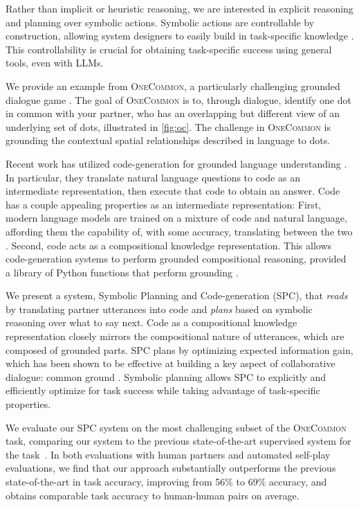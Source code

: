 \documentclass[11pt]{article}
\newcommand{\system}{SPC}
\newcommand{\justin}[1]{{{\textcolor{purple}{(Justin: #1)}}}}
\begin{document}
Rather than implicit or heuristic reasoning, we are interested in explicit reasoning and planning over
symbolic actions.
Symbolic actions are controllable by construction,
allowing system designers to easily build in task-specific knowledge \citep{he2018dnd,cicero}.
This controllability is crucial for obtaining task-specific success using general tools,
even with LLMs.

We provide an example from \textsc{OneCommon}, 
a particularly challenging grounded dialogue game \citep{onecommon}.
The goal of \textsc{OneCommon} is to, through dialogue, identify one dot in common with your partner,
who has an overlapping but different view of an underlying set of dots, illustrated in \autoref{fig:oc}.
The challenge in \textsc{OneCommon} is grounding the contextual spatial relationships described in language to dots.

Recent work has utilized code-generation for grounded language understanding \citep{vipergpt}.
In particular, they translate natural language questions to code as an intermediate representation, then execute that code to obtain an answer.
Code has a couple appealing properties as an intermediate representation: First, 
modern language models are trained on a mixture of code and natural language, affording them the capability of, with some accuracy, translating between the two \citep{chen2021evaluating}.
Second, code acts as a compositional knowledge representation.
This allows code-generation systems to perform grounded compositional reasoning,
provided a library of Python functions that perform grounding \citep{codeaspolicies2022}.

We present a system, Symbolic Planning and Code-generation (\system{}), 
that \textit{reads} by translating partner utterances into code and \textit{plans}
based on symbolic reasoning over what to say next.
Code as a compositional knowledge representation closely mirrors the compositional nature of utterances, which are composed of grounded parts.
\system{} plans by optimizing expected information gain, which has been shown to be effective at building 
a key aspect of collaborative dialogue: common ground \citep{yu2019info,white-etal-2021-open,ocp}.
Symbolic planning allows \system{} to explicitly and efficiently optimize for task success while taking advantage of task-specific properties.

We evaluate our \system{} system on the most challenging subset of the \textsc{OneCommon} task, comparing our system to the previous state-of-the-art supervised system for the task~\citep{fried}. In both evaluations with human partners and automated self-play evaluations, we find that our approach substantially outperforms the previous state-of-the-art in task accuracy, improving from 56\% to 69\% accuracy, and obtains comparable task accuracy to human-human pairs on average.
\end{document}
